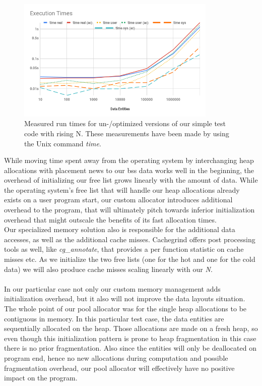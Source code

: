 \begin{figure}[!htbp]
	\centering
	\includegraphics[width=0.85\textwidth, height=0.5\textwidth]{PICs/test_file_execution_times}
	\caption{Measured run times for un-/optimized versions of our simple test code with rising N. These measurements have been made by using the Unix command \textit{time}.}
	\label{test_file_execution_times}
\end{figure}
While moving time spent away from the operating system by interchanging heap allocations with placement news to our bss data works well in the beginning, the overhead of initializing our free list grows linearly with the amount of data. While the operating system's free list that will handle our heap allocations already exists on a user program start, our custom allocator introduces additional overhead to the program, that will ultimately pitch towards inferior initialization overhead that might outscale the benefits of its fast allocation times.\\
Our specialized memory solution also is responsible for the additional data accesses, as well as the additional cache misses. Cachegrind offers post processing tools as well, like \textit{cg\_annotate}, that provides a per function statistic on cache misses etc. As we initialize the two free lists (one for the hot and one for the cold data) we will also produce cache misses scaling linearly with our \textit{N}.\\\\
In our particular case not only our custom memory management adds initialization overhead, but it also will not improve the data layouts situation. The whole point of our pool allocator was for the single heap allocations to be contiguous in memory. In this particular test case, the data entities are sequentially allocated on the heap. Those allocations are made on a fresh heap, so even though this initialization pattern is prone to heap fragmentation in this case there is no prior fragmentation. Also since the entities will only be deallocated on program end, hence no new allocations during computation and possible fragmentation overhead, our pool allocator will effectively have no positive impact on the program. 
